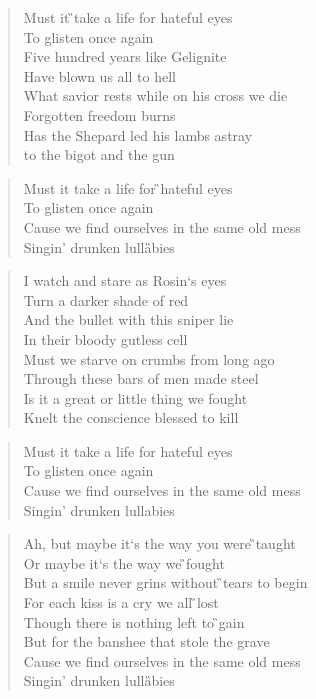 \documentclass[9pt,a4paper,oneside, onecolumn]{article}
\begin{document}
\begin{multicols}{2}

\begin{verse}
Must it \G{}take a life for hateful eyes\\
To \Em{}glisten once again\\
Five \C{}hundred years like Gelignite\\
Have \Em{}blown us all to \D{}hell\\
What savior rests while on his cross we die\\
Forgotten freedom burns\\
Has the Shepard led his lambs astray\\
to the bigot and the gun\\
\end{verse}
\begin{verse}
Must it \C{}take a life for \G{}hateful eyes\\
To \C{}glisten once \D{}again\\
Cause we find ourselves in the \Em{}same old mess\\
Singin' drunken lulla\G{}bies\\
\end{verse}
\begin{verse}
I watch and stare as Rosin`s eyes\\
Turn a darker shade of red\\
And the bullet with this sniper lie\\
In their bloody gutless cell\\
Must we starve on crumbs from long ago\\
Through these bars of men made steel\\
Is it a great or little thing we fought\\
Knelt the conscience blessed to kill\\
\end{verse}
\begin{verse}
Must it take a life for hateful eyes\\
To glisten once again\\
Cause we find ourselves in the same old mess\\
Singin' drunken lullabies\\
\end{verse}
\columnbreak
\begin{verse}
Ah, but \C{}maybe it`s the \D{}way you were \G{}taught\\
Or \C{}maybe it`s the \D{}way we \G{}fought\\
But a \C{}smile never \D{}grins without \G{}tears to \C{}begin\\
For each \C{}kiss is a \D{}cry we all \G{}lost\\
Though there is \C{}nothing left to \G{}gain\\
But for the \C{}banshee that stole the \D{}grave\\
Cause we find ourselves in the \Em{}same old mess\\
Singin' drunken lulla\G{}bies\\
\end{verse}


\end{multicols}
\end{document}
